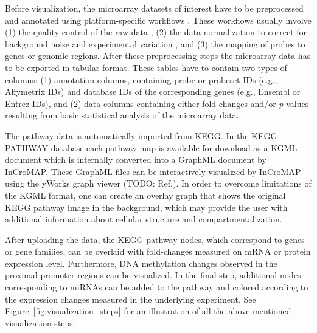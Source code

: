 \documentclass{bioinfo}
\begin{document}
Before visualization, the microarray datasets of interest have to be preprocessed and annotated
using platform-specific workflows \citep{Limma, AgiMicroRna}. These
workflows usually involve (1) the quality control of the raw data \citep{arrayQualityMetrics}, (2) the data normalization to correct for background noise and experimental
variation \citep{Lim2007}, and (3) the mapping
of probes to genes or genomic regions. After these preprocessing steps the microarray data has
to be exported in tabular format. These tables have to contain two types of
columns: (1) annotation columns, containing probe or probeset IDs (e.g., Affymetrix IDs) and
database IDs of the corresponding genes (e.g., Ensembl or Entrez IDs), and (2) data columns
containing either fold-changes and/or \emph{p}-values resulting from basic statistical analysis of the
microarray data.


The pathway data is automatically imported from KEGG. In the KEGG PATHWAY database each pathway map
is available for download as a KGML document which is internally converted into a GraphML document
by InCroMAP. These GraphML files can be interactively visualized by InCroMAP using the yWorks graph
viewer (TODO: Ref.). In order to overcome limitations of the KGML format, one can create an overlay
graph that shows the original KEGG pathway image in the background, which may provide the user with
additional information about cellular structure and compartmentalization.

After uploading the data, the KEGG pathway nodes, which correspond to genes or gene families, can be
overlaid with fold-changes measured on mRNA or protein expression level. Furthermore, DNA
methylation changes observed in the proximal promoter regions can be visualized. In the final step,
additional nodes corresponding to miRNAs can be added to the pathway and colored according to the
expression changes measured in the underlying experiment. See Figure~\ref{fig:visualization_steps}
for an illustration of all the above-mentioned visualization steps.
\end{document}
